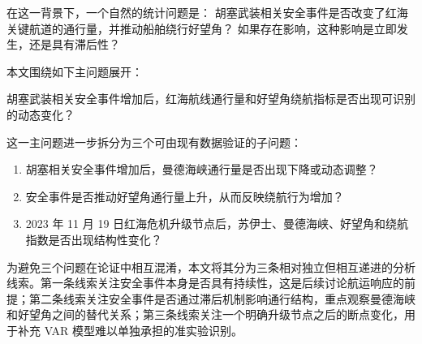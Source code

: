 \documentclass[
]{ctexart}
\newenvironment{Shaded}{}{}
\newcommand{\NormalTok}[1]{#1}
\providecommand{\tightlist}{%
  \setlength{\itemsep}{0pt}\setlength{\parskip}{0pt}}
\begin{document}
在这一背景下，一个自然的统计问题是：
胡塞武装相关安全事件是否改变了红海关键航道的通行量，并推动船舶绕行好望角？
如果存在影响，这种影响是立即发生，还是具有滞后性？

本文围绕如下主问题展开：

\begin{Shaded}
\begin{Highlighting}[]
\NormalTok{胡塞武装相关安全事件增加后，红海航线通行量和好望角绕航指标是否出现可识别的动态变化？}
\end{Highlighting}
\end{Shaded}

这一主问题进一步拆分为三个可由现有数据验证的子问题：

\begin{enumerate}
\def\labelenumi{\arabic{enumi}.}
\tightlist
\item
  胡塞相关安全事件增加后，曼德海峡通行量是否出现下降或动态调整？
\item
  安全事件是否推动好望角通行量上升，从而反映绕航行为增加？
\item
  2023 年 11 月 19 日红海危机升级节点后，苏伊士、曼德海峡、好望角和绕航指数是否出现结构性变化？
\end{enumerate}

为避免三个问题在论证中相互混淆，本文将其分为三条相对独立但相互递进的分析线索。第一条线索关注安全事件本身是否具有持续性，这是后续讨论航运响应的前提；第二条线索关注安全事件是否通过滞后机制影响通行结构，重点观察曼德海峡和好望角之间的替代关系；第三条线索关注一个明确升级节点之后的断点变化，用于补充
VAR 模型难以单独承担的准实验识别。
\end{document}
